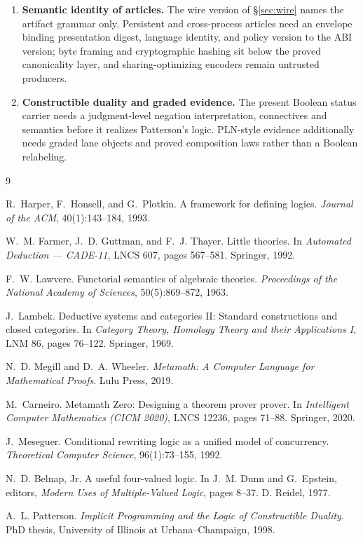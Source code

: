 \documentclass[]{article}
\theoremstyle{remark}
\begin{document}
\begin{enumerate}
\item \textbf{Semantic identity of articles.}  The wire version of
  \S\ref{sec:wire} names the artifact grammar only.  Persistent and
  cross-process articles need an envelope binding presentation digest,
  language identity, and policy version to the ABI version; byte framing
  and cryptographic hashing sit below the proved canonicality layer, and
  sharing-optimizing encoders remain untrusted producers.
\item \textbf{Constructible duality and graded evidence.}  The present
  Boolean status carrier needs a judgment-level negation interpretation,
  connectives and semantics before it realizes Patterson's logic.  PLN-style
  evidence additionally needs graded lane objects and proved composition
  laws rather than a Boolean relabeling.
\end{enumerate}

\begin{thebibliography}{9}

R.~Harper, F.~Honsell, and G.~Plotkin.
\newblock A framework for defining logics.
\newblock \emph{Journal of the ACM}, 40(1):143--184, 1993.

W.~M. Farmer, J.~D. Guttman, and F.~J. Thayer.
\newblock Little theories.
\newblock In \emph{Automated Deduction --- CADE-11}, LNCS 607, pages
  567--581. Springer, 1992.

F.~W. Lawvere.
\newblock Functorial semantics of algebraic theories.
\newblock \emph{Proceedings of the National Academy of Sciences},
  50(5):869--872, 1963.

J.~Lambek.
\newblock Deductive systems and categories II: Standard constructions and
  closed categories.
\newblock In \emph{Category Theory, Homology Theory and their Applications
  I}, LNM 86, pages 76--122. Springer, 1969.

N.~D. Megill and D.~A. Wheeler.
\newblock \emph{Metamath: A Computer Language for Mathematical Proofs}.
\newblock Lulu Press, 2019.

M.~Carneiro.
\newblock Metamath Zero: Designing a theorem prover prover.
\newblock In \emph{Intelligent Computer Mathematics (CICM 2020)}, LNCS
  12236, pages 71--88. Springer, 2020.

J.~Meseguer.
\newblock Conditional rewriting logic as a unified model of concurrency.
\newblock \emph{Theoretical Computer Science}, 96(1):73--155, 1992.

N.~D. Belnap, Jr.
\newblock A useful four-valued logic.
\newblock In J.~M. Dunn and G.~Epstein, editors, \emph{Modern Uses of
  Multiple-Valued Logic}, pages 8--37. D. Reidel, 1977.

A.~L. Patterson.
\newblock \emph{Implicit Programming and the Logic of Constructible
  Duality}.
\newblock PhD thesis, University of Illinois at Urbana--Champaign, 1998.

\end{thebibliography}
\end{document}
